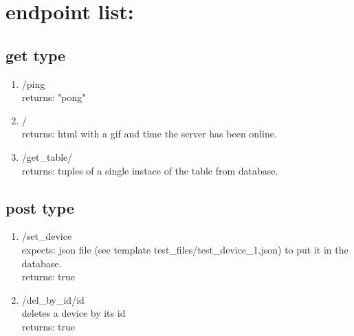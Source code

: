 \documentclass{article}
\begin{document}
\section*{endpoint list:}
\subsection*{get type}
\begin{enumerate}
    \item /ping \\ returns: "pong"
    \item / \\ returns: html with a gif and time the server has been online.
    \item /get\_table/ \\ returns: tuples of a single instace of the table from database.
\end{enumerate}

\subsection*{post type}
\begin{enumerate}
    \item /set\_device \\ expects: json file (see template test\_files/test\_device\_1.json) to put it in the database.\\ returns: true 
    \item /del\_by\_id/{id} \\ deletes a device by its id \\ returns: true
\end{enumerate}
\end{document}
